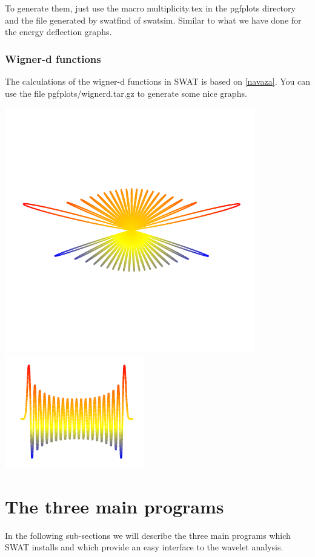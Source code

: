 \documentclass[12pt]{article}
\begin{document}
To generate them, just use the macro multiplicity.tex in the pgfplots directory
and the file generated by swatfind of swatsim. Similar to what we have done for
the energy deflection graphs.

\subsubsection{Wigner-d functions}

The calculations of the wigner-d functions in SWAT is based on \ref{navaza}.
You can use the file pgfplots/wignerd.tar.gz to generate some nice graphs.

\includegraphics[scale=1.0]{wignerpolar.pdf}
\includegraphics[scale=1.0]{wigner.pdf} 

\section{The three main programs}
In the following sub-sections we will describe the three main programs which 
SWAT installs and which provide an easy interface to the wavelet analysis.
\end{document}
